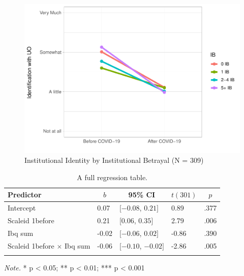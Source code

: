 \documentclass[
  english,
  man, noextraspace]{apa6}
\begin{document}
\begin{figure}[H]

{\centering \includegraphics[width=\textwidth]{papaja_doc_files/figure-latex/figure3-1} 

}

\caption{Institutional Identity by Institutional Betrayal (N = 309) 
}\label{fig:figure3}
\end{figure}

\begin{table}[tbp]

\begin{center}
\begin{threeparttable}

\caption{\label{tab:table3}A full regression table.}

\begin{tabular}{lllll}
\toprule
Predictor & \multicolumn{1}{c}{$b$} & \multicolumn{1}{c}{95\% CI} & \multicolumn{1}{c}{$t(301)$} & \multicolumn{1}{c}{$p$}\\
\midrule
Intercept & 0.07 & $[-0.08$, $0.21]$ & 0.89 & .377\\
Scaleid 1before & 0.21 & $[0.06$, $0.35]$ & 2.79 & .006\\
Ibq sum & -0.02 & $[-0.06$, $0.02]$ & -0.86 & .390\\
Scaleid 1before $\times$ Ibq sum & -0.06 & $[-0.10$, $-0.02]$ & -2.86 & .005\\
\bottomrule
\addlinespace
\end{tabular}

\begin{tablenotes}[para]
\normalsize{\textit{Note.} * p < 0.05; ** p < 0.01; *** p < 0.001}
\end{tablenotes}

\end{threeparttable}
\end{center}

\end{table}
\end{document}
